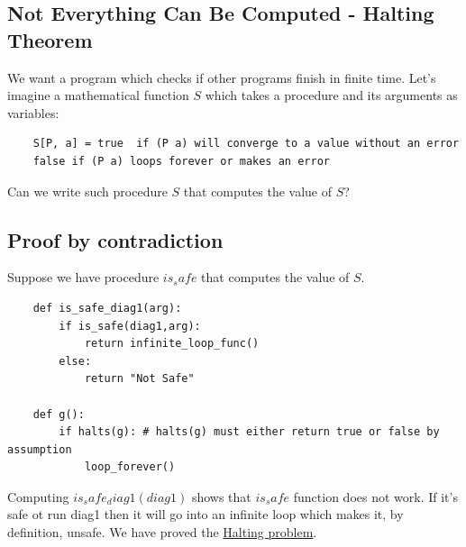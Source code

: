 \documentclass[a4paper,twoside]{article}
\numberwithin{equation}{section}
\begin{document}
\subsection{Not Everything Can Be Computed - Halting Theorem}
We want a program which checks if other programs finish in finite time.
Let's imagine a mathematical function $S$ which takes a procedure and its arguments as variables:
\begin{lstlisting}
    S[P, a] = true  if (P a) will converge to a value without an error
    false if (P a) loops forever or makes an error
\end{lstlisting}
Can we write such procedure $S$ that computes the value of $S$?
\subsection{Proof by contradiction}
Suppose we have procedure $is_safe$ that computes the value of $S$.
\begin{lstlisting}
    def is_safe_diag1(arg):
        if is_safe(diag1,arg):
            return infinite_loop_func()
        else:
            return "Not Safe"

    def g():
        if halts(g): # halts(g) must either return true or false by assumption
            loop_forever()

\end{lstlisting}
Computing $is_safe_diag1(diag1)$ shows that $is_safe$ function does not work.
If it's safe ot run diag1 then it will go into an infinite loop which makes it, by definition, unsafe.
We have proved the \href{https://en.wikipedia.org/wiki/Halting_problem}{Halting problem}.
\end{document}
